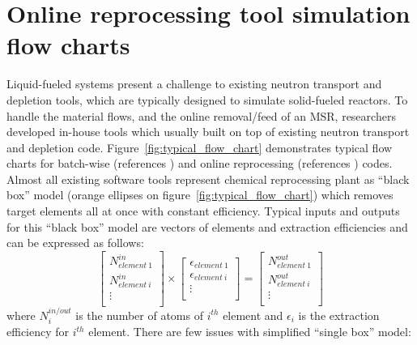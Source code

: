 \section{Online reprocessing tool simulation flow charts}
Liquid-fueled systems present a challenge to existing neutron transport 
and depletion tools, which are typically designed to simulate 
solid-fueled reactors. To handle the material flows, and the online 
removal/feed of an \gls{MSR}, researchers developed in-house 
tools which usually built on top of existing neutron transport and 
depletion code. Figure~\ref{fig:typical_flow_chart} demonstrates typical 
flow charts for batch-wise (references \cite{betzler_molten_2017,
li_optimization_2018,rykhlevskii_modeling_2019,zhou_fuel_2018-1,
sheu_depletion_2013,park_whole_2015}) and 
online reprocessing (references \cite{heuer_simulation_2010,
doligez_coupled_2014,  heuer_towards_2014, fiorina_investigation_2013,
nuttin_potential_2005, aufiero_extended_2013,
de_troullioud_de_lanversin_toward_2017}) codes. Almost all existing 
software tools represent chemical reprocessing plant as ``black box'' 
model (orange ellipses on figure~\ref{fig:typical_flow_chart}) which 
removes target 
elements all at once with constant efficiency. Typical inputs and outputs 
for this ``black box'' model are vectors of elements and extraction 
efficiencies and can be 
expressed as follows:
\begin{equation}
\begin{bmatrix}
N^{in}_{element \: 1} \\ N^{in}_{element \: i} \\ \vdots \\
\end{bmatrix} 
\times
\begin{bmatrix}
\epsilon_{element \: 1} \\ \epsilon_{element \: i} \\ \vdots \\
\end{bmatrix} =
\begin{bmatrix}
N^{out}_{element \: 1} \\ N^{out}_{element \: i} \\ \vdots \\
\end{bmatrix}
\end{equation}
where $N^{in/out}_i$ is the number of atoms of $i^{th}$ element and $\epsilon_i$ is the 
extraction efficiency for $i^{th}$ element. There are few issues with simplified 
``single box'' model: 
